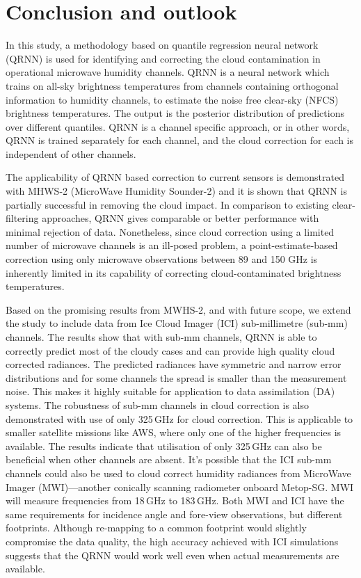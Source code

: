 \documentclass[amt, manuscript]{copernicus}
\begin{document}
\section{Conclusion and outlook}  %
\label{conclusions}
%

In this study, a methodology based on quantile regression neural network (QRNN) is used for identifying and correcting the cloud contamination in operational microwave humidity channels. QRNN is a neural network which trains on all-sky brightness temperatures from channels containing orthogonal information to humidity channels, to estimate the noise free clear-sky (NFCS) brightness temperatures. The output is the posterior distribution of predictions over different quantiles. QRNN is a channel specific approach, or in other words, QRNN is trained separately for each channel, and the cloud correction for each is independent of other channels. 

The applicability of QRNN based correction to current sensors is demonstrated with MHWS-2 (MicroWave Humidity Sounder-2) and it is shown that QRNN is partially successful in removing the cloud impact. In comparison to existing clear-filtering approaches, QRNN gives comparable or better performance with minimal rejection of data. Nonetheless, since cloud correction
using a limited number of microwave channels is an ill-posed problem, a point-estimate-based correction using only microwave observations between 89 and 150 GHz is inherently limited in its capability of correcting cloud-contaminated brightness temperatures. 

Based on the promising results from MWHS-2, and with future scope, we extend the study to include data from Ice Cloud Imager (ICI) sub-millimetre (sub-mm) channels. The results show that with  sub-mm channels, QRNN is able to correctly predict most of the cloudy cases and can provide high quality cloud corrected radiances. The predicted radiances have symmetric and narrow error distributions and for some channels the spread is smaller than the measurement noise. This makes it highly suitable for application to data assimilation (DA) systems. The robustness of sub-mm channels in cloud correction is also demonstrated with use of only 325\,GHz for cloud correction. This is applicable to smaller satellite missions like AWS, where only one of the higher frequencies is available. The results indicate that utilisation of only 325\,GHz can also be beneficial when other channels are absent. It's possible that the ICI sub-mm channels could also be used to cloud correct humidity radiances from MicroWave Imager (MWI)---another conically scanning radiometer onboard Metop-SG. MWI will measure frequencies from 18\,GHz to 183\,GHz. Both MWI and ICI have the same requirements for incidence angle and fore-view observations, but different footprints. Although re-mapping to a common footprint  would slightly compromise the data quality, the high accuracy achieved with ICI simulations suggests that the QRNN would work well even when actual measurements are available.
\end{document}
